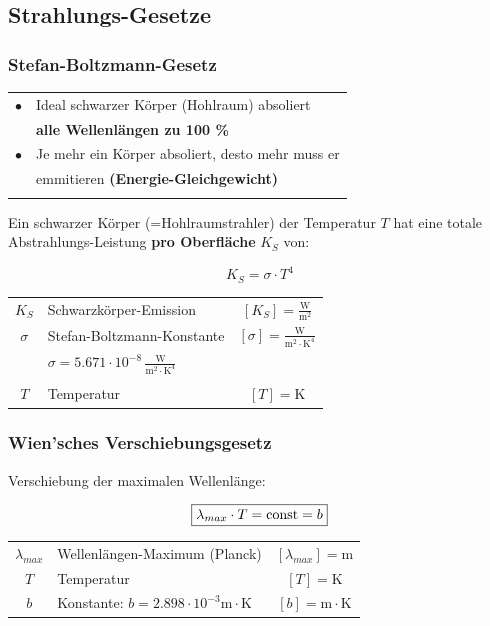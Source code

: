 \subsection{Strahlungs-Gesetze}


\subsubsection{Stefan-Boltzmann-Gesetz}

\begin{tabular}{ll}
$\bullet$ & Ideal schwarzer Körper (Hohlraum) absoliert  \\
		  & \textbf{alle Wellenlängen zu 100 \%}   \\		
$\bullet$ & Je mehr ein Körper absoliert, desto mehr muss er \\
		  & emmitieren \textbf{(Energie-Gleichgewicht)}   \\	
		  \\
\end{tabular}

Ein schwarzer Körper (=Hohlraumstrahler) der Temperatur $T$ hat eine totale Abstrahlungs-Leistung \textbf{pro Oberfläche} $K_S$ von: 

$$ \boxed{ K_S = \sigma \cdot T^4 }  $$



\begin{tabular}{c l c}
	\rule{0pt}{10pt}$K_S$ & Schwarzkörper-Emission & $[K_S] = \mathrm{\frac{W}{m^2}}$ \\
	\rule{0pt}{10pt}$\sigma$ & Stefan-Boltzmann-Konstante  & $[\sigma] = \mathrm{\frac{W}{m^2 \cdot K^4}}$\\
	\rule{0pt}{10pt}&  $\sigma = 5.671 \cdot 10^{-8} \, \mathrm{\frac{W}{m^2 \cdot K^4}}$ &  \\ \\
	$T$ & Temperatur & $[T] = \mathrm{K}$ \\
\end{tabular}




\subsubsection{Wien'sches Verschiebungsgesetz}

Verschiebung der maximalen Wellenlänge:

$$ \boxed{ \lambda_{max} \cdot T = \mathrm{const} = b  }  $$

\begin{tabular}{c l c}
	$\lambda_{max}$ & Wellenlängen-Maximum (Planck) & $[\lambda_{max}] = \mathrm{m}$ \\
	$T$ & Temperatur & $[T] = \mathrm{K}$ \\
	\rule{0pt}{8pt}$b$ & Konstante: $b = 2.898 \cdot 10^{-3} \mathrm{ m \cdot K}$ & $ [b] = \mathrm{ m \cdot K}$ \\
\end{tabular}





